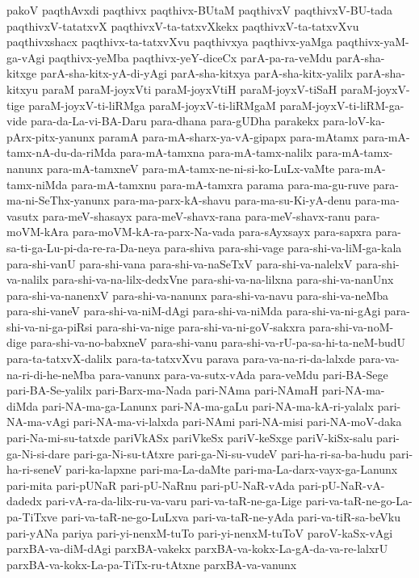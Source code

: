 {pakoV
paqthAvxdi
paqthivx
paqthivx-BUtaM
paqthivxV
paqthivxV-BU-tada
paqthivxV-tatatxvX
paqthivxV-ta-tatxvXkekx
paqthivxV-ta-tatxvXvu
paqthivxshacx
paqthivx-ta-tatxvXvu
paqthivxya
paqthivx-yaMga
paqthivx-yaM-ga-vAgi
paqthivx-yeMba
paqthivx-yeY-diceCx
parA-pa-ra-veMdu
parA-sha-kitxge
parA-sha-kitx-yA-di-yAgi
parA-sha-kitxya
parA-sha-kitx-yalilx
parA-sha-kitxyu
paraM
paraM-joyxVti
paraM-joyxVtiH
paraM-joyxV-tiSaH
paraM-joyxV-tige
paraM-joyxV-ti-liRMga
paraM-joyxV-ti-liRMgaM
paraM-joyxV-ti-liRM-ga-vide
para-da-La-vi-BA-Daru
para-dhana
para-gUDha
parakekx
para-loV-ka-pArx-pitx-yanunx
paramA
para-mA-sharx-ya-vA-gipapx
para-mAtamx
para-mA-tamx-nA-du-da-riMda
para-mA-tamxna
para-mA-tamx-nalilx
para-mA-tamx-nanunx
para-mA-tamxneV
para-mA-tamx-ne-ni-si-ko-LuLx-vaMte
para-mA-tamx-niMda
para-mA-tamxnu
para-mA-tamxra
parama
para-ma-gu-ruve
para-ma-ni-SeThx-yanunx
para-ma-parx-kA-shavu
para-ma-su-Ki-yA-denu
para-ma-vasutx
para-meV-shasayx
para-meV-shavx-rana
para-meV-shavx-ranu
para-moVM-kAra
para-moVM-kA-ra-parx-Na-vada
para-sAyxsayx
para-sapxra
para-sa-ti-ga-Lu-pi-da-re-ra-Da-neya
para-shiva
para-shi-vage
para-shi-va-liM-ga-kala
para-shi-vanU
para-shi-vana
para-shi-va-naSeTxV
para-shi-va-nalelxV
para-shi-va-nalilx
para-shi-va-na-lilx-dedxVne
para-shi-va-na-lilxna
para-shi-va-nanUnx
para-shi-va-nanenxV
para-shi-va-nanunx
para-shi-va-navu
para-shi-va-neMba
para-shi-vaneV
para-shi-va-niM-dAgi
para-shi-va-niMda
para-shi-va-ni-gAgi
para-shi-va-ni-ga-piRsi
para-shi-va-nige
para-shi-va-ni-goV-sakxra
para-shi-va-noM-dige
para-shi-va-no-babxneV
para-shi-vanu
para-shi-va-rU-pa-sa-hi-ta-neM-budU
para-ta-tatxvX-dalilx
para-ta-tatxvXvu
parava
para-va-na-ri-da-lalxde
para-va-na-ri-di-he-neMba
para-vanunx
para-va-sutx-vAda
para-veMdu
pari-BA-Sege
pari-BA-Se-yalilx
pari-Barx-ma-Nada
pari-NAma
pari-NAmaH
pari-NA-ma-diMda
pari-NA-ma-ga-Lanunx
pari-NA-ma-gaLu
pari-NA-ma-kA-ri-yalalx
pari-NA-ma-vAgi
pari-NA-ma-vi-lalxda
pari-NAmi
pari-NA-misi
pari-NA-moV-daka
pari-Na-mi-su-tatxde
pariVkASx
pariVkeSx
pariV-keSxge
pariV-kiSx-salu
pari-ga-Ni-si-dare
pari-ga-Ni-su-tAtxre
pari-ga-Ni-su-vudeV
pari-ha-ri-sa-ba-hudu
pari-ha-ri-seneV
pari-ka-lapxne
pari-ma-La-daMte
pari-ma-La-darx-vayx-ga-Lanunx
pari-mita
pari-pUNaR
pari-pU-NaRnu
pari-pU-NaR-vAda
pari-pU-NaR-vA-dadedx
pari-vA-ra-da-lilx-ru-va-varu
pari-va-taR-ne-ga-Lige
pari-va-taR-ne-go-La-pa-TiTxve
pari-va-taR-ne-go-LuLxva
pari-va-taR-ne-yAda
pari-va-tiR-sa-beVku
pari-yANa
pariya
pari-yi-nenxM-tuTo
pari-yi-nenxM-tuToV
paroV-kaSx-vAgi
parxBA-va-diM-dAgi
parxBA-vakekx
parxBA-va-kokx-La-gA-da-va-re-lalxrU
parxBA-va-kokx-La-pa-TiTx-ru-tAtxne
parxBA-va-vanunx
}
